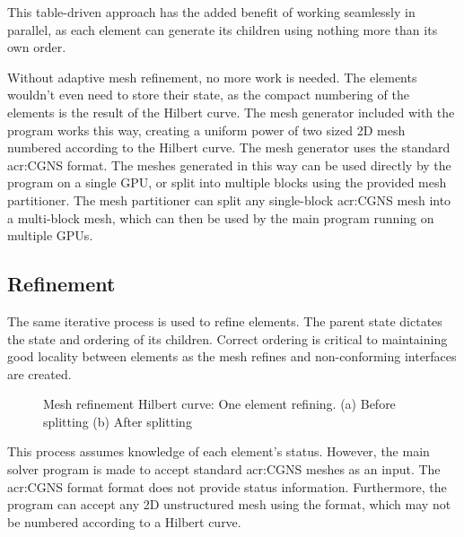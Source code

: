 This table-driven approach has the added benefit of working seamlessly in parallel, as each element
can generate its children using nothing more than its own order.

Without adaptive mesh refinement, no more work is needed. The elements wouldn't even need to store
their state, as the compact numbering of the elements is the result of the Hilbert curve. The mesh
generator included with the program works this way, creating a uniform power of two sized 2D mesh
numbered according to the Hilbert curve. The mesh generator uses the standard \acrshort{acr:CGNS}
format. The meshes generated in this way can be used directly by the program on a single GPU, or
split into multiple blocks using the provided mesh partitioner. The mesh partitioner can split any
single-block \acrshort{acr:CGNS} mesh into a multi-block mesh, which can then be used by the main
program running on multiple GPUs.

\subsection{Refinement} \label{section:load_balancing:hilbert_curve:refinement}

The same iterative process is used to refine elements. The parent state dictates the state and
ordering of its children. Correct ordering is critical to maintaining good locality between elements
as the mesh refines and non-conforming interfaces are created.

\begin{figure}[H]
	\centering
	\hfill
	\caption{Mesh refinement Hilbert curve: One element refining. (a) Before splitting (b) After splitting}
	\label{fig:hilbert_refining}
\end{figure}

This process assumes knowledge of each element's status. However, the main solver program is made to
accept standard \acrshort{acr:CGNS} meshes as an input. The \acrshort{acr:CGNS} format format does
not provide status information. Furthermore, the program can accept any 2D unstructured mesh using
the format, which may not be numbered according to a Hilbert curve. 

